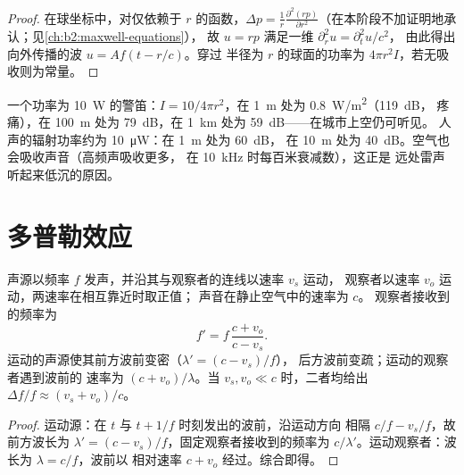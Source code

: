 \begin{proof}
在球坐标中，对仅依赖于 $r$ 的函数，$\Delta p =
\frac1r\frac{\partial^2(rp)}{\partial r^2}$（在本阶段不加证明地承认；见\cref{ch:b2:maxwell-equations}），
故 $u = rp$ 满足一维 $\partial_r^2u = \partial_t^2u/c^2$，
由此得出向外传播的波 $u = Af(t - r/c)$。穿过
半径为 $r$ 的球面的功率为 $4\pi r^2I$，若无吸收则为常量。
\end{proof}

\begin{example}[警笛与交谈]\label{ex:b2:sound-waves:siren}
一个功率为 \qty{10}{W} 的警笛：$I = 10/4\pi r^2$，在 \qty{1}{m} 处为 \qty{0.8}{W/m^2}（\qty{119}{dB}，
疼痛），在 \qty{100}{m} 处为 \qty{79}{dB}，在 \qty{1}{km} 处为 \qty{59}{dB}——在城市上空仍可听见。
人声的辐射功率约为 \qty{10}{\micro W}：在 \qty{1}{m} 处为 \qty{60}{dB}，
在 \qty{10}{m} 处为 \qty{40}{dB}。空气也会吸收声音（高频声吸收更多，
在 \qty{10}{kHz} 时每百米衰减数），这正是
远处雷声听起来低沉的原因。
\end{example}

\section{多普勒效应}

\begin{theorem}[多普勒效应]\label{thm:b2:sound-waves:doppler}
声源以频率 $f$ 发声，并沿其与观察者的连线以速率 $v_s$ 运动，
观察者以速率 $v_o$ 运动，两速率在相互靠近时取正值；
声音在静止空气中的速率为 $c$。
观察者接收到的频率为
\[
f' = f\,\frac{c + v_o}{c - v_s} .
\]
运动的声源使其前方波前变密（$\lambda' = (c - v_s)/f$），
后方波前变疏；运动的观察者遇到波前的
速率为 $(c + v_o)/\lambda$。当 $v_s, v_o \ll c$ 时，二者均给出 $\Delta f/f \approx
(v_s + v_o)/c$。
\end{theorem}

\begin{proof}
运动源：在 $t$ 与 $t + 1/f$ 时刻发出的波前，沿运动方向
相隔 $c/f - v_s/f$，故前方波长为
$\lambda' = (c - v_s)/f$，固定观察者接收到的频率为
$c/\lambda'$。运动观察者：波长为 $\lambda = c/f$，波前以
相对速率 $c + v_o$ 经过。综合即得。
\end{proof}

